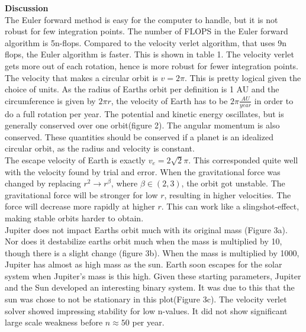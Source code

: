 \documentclass[10pt,a4paper]{article}
\begin{document}
\newpage
{\LARGE\bf
Discussion
}
\\









\noindent The Euler forward method is easy for the computer to handle, but it is not robust for few integration points. The number of FLOPS in the Euler forward algorithm is 5n-flops. Compared to the velocity verlet algorithm, that uses 9n flops, the Euler algorithm is faster. This is shown in table 1. The velocity verlet gets more out of each rotation, hence is more robust for fewer integration points. The velocity that makes a circular orbit is $v=2\pi$. This is pretty logical given the choice of units. As the radius of Earths orbit per definition is 1 AU and the circumference is given by $2\pi r$, the velocity of Earth has to be $2\pi \frac{AU}{year}$ in order to do a full rotation per year. The potential and kinetic energy oscillates, but is generally conserved over one orbit(figure 2). The angular momentum is also conserved. These quantities should be conserved if a planet is an idealized circular orbit, as the radius and velocity is constant.  \\

\noindent The escape velocity of Earth is exactly $v_e=2\sqrt{2}\pi$. This corresponded quite well with the velocity found by trial and error. When the gravitational force was changed by replacing $r^2\rightarrow r^\beta$, where $\beta \in(2,3)$, the orbit got unstable. The gravitational force will be stronger for low $r$, resulting in higher velocities. The force will decrease more rapidly at higher $r$. This can work like a slingshot-effect, making stable orbits harder to obtain. \\

\noindent Jupiter does not impact Earths orbit much with its original mass (Figure 3a). Nor does it destabilize earths orbit much when the mass is multiplied by 10, though there is a slight change (figure 3b). When the mass is multiplied by 1000, Jupiter has almost as high mass as the sun. Earth soon escapes for the solar system when Jupiter's mass is this high. Given these starting parameters, Jupiter and the Sun developed an interesting binary system. It was due to this that the sun was chose to not be stationary in this plot(Figure 3c). The velocity verlet solver showed impressing stability for low n-values. It did not show significant large scale weakness before $n\approx 50$ per year.\\
\end{document}

